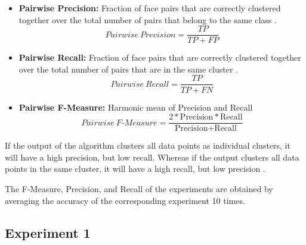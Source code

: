 \documentclass[12pt,english]{article}
\begin{document}
\begin{itemize}
\item \textbf{Pairwise Precision:} Fraction of face pairs that are correctly clustered together over the total number of pairs that belong to the same class \cite{shi}.
$$ Pairwise \ Precision = \frac{TP}{TP + FP}$$

\item \textbf{Pairwise Recall:} Fraction of face pairs that are correctly clustered together over the total number of pairs that are in the same cluster \cite{shi}.
$$ Pairwise \ Recall = \frac{TP}{TP + FN}$$

\item \textbf{Pairwise F-Measure:} Harmonic mean of Precision and Recall \cite{shi} $$Pairwise \ F\textrm{-}Measure = \frac{2 * \textrm{Precision}*\textrm{Recall}}{\textrm{Precision} + \textrm{Recall}}$$
\end{itemize}
If the output of the algorithm clusters all data points as individual clusters, it will have a high precision, but low recall. Whereas if the output clusters all data points in the same cluster, it will have a high recall, but low precision \cite{otto}.




The F-Measure, Precision, and Recall of the experiments are obtained by averaging the accuracy of the corresponding experiment 10 times.

\subsection{Experiment 1}
\end{document}
